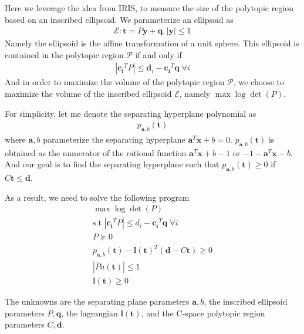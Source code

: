 \documentclass{article}
\renewcommand{\vec}[1]{\mathbf{#1}}
\begin{document}
Here we leverage the idea from IRIS, to measure the size of the polytopic region based on an inscribed ellipsoid. We parameterize an ellipsoid as
\begin{align}
	\mathcal{E}: \vec{t} = P\vec{y}+\vec{q}, |\vec{y}|\le 1
\end{align}
Namely the ellipsoid is the affine transformation of a unit sphere. This ellipsoid is contained in the polytopic region $\mathcal{P}$ if and only if
\begin{align}
	|\vec{c_i}^TP|\le \vec{d}_i - \vec{c_i}^T\vec{q} \;\forall i
\end{align}
And in order to maximize the volume of the polytopic region $\mathcal{P}$, we choose to maximize the volume of the inscribed ellipsoid $\mathcal{E}$, namely $\max \log\det(P)$.

For simplicity, let me denote the separating hyperplane polynomial as
\begin{align}
	p_{\vec{a}, b}(\vec{t})
\end{align}
where $\vec{a}, b$ parameterize the separating hyperplane $\vec{a}^T\vec{x} + b=0$. $p_{\vec{a}, b}(\vec{t})$ is obtained as the numerator of the rational function $\vec{a}^T\vec{x} + b - 1$ or $-1 - \vec{a}^T\vec{x}-b$. And our goal is to find the separating hyperplane such that $p_{\vec{a}, b}(\vec{t}) \ge 0$ if $C\vec{t}\le\vec{d}$.

As a result, we need to solve the following program
\begin{align}
	\max\log\det(P)\\
	\text{s.t } |\vec{c_i}^TP|\le d_i - \vec{c_i}^T\vec{q}\;\forall i\\
	P\succeq 0\\
	p_{\vec{a}, b}(\vec{t}) - \vec{l}(\vec{t})^T(\vec{d} - C\vec{t})\ge 0\\
	|\bar{P}a(\vec{t})|\le 1\\
	\vec{l}(\vec{t}) \ge 0
\end{align}

The unknowns are the separating plane parameters $\vec{a}, b$, the inscribed ellipsoid parameters $P, \vec{q}$, the lagrangian $\vec{l}(\vec{t})$, and the C-space polytopic region parameters $C, \vec{d}$.
\end{document}
